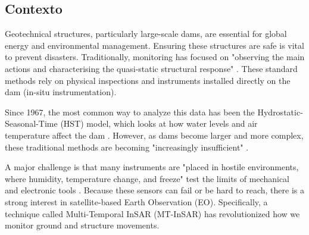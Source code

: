 \documentclass[11pt,a4paper]{article}
\begin{document}
\subsection{Contexto}

Geotechnical structures, particularly large-scale dams, are essential for global energy and environmental management. Ensuring these structures are safe is vital to prevent disasters. Traditionally, monitoring has focused on "observing the main actions and characterising the quasi-static structural response" \parencite{mataAnalysisInterpretationObserved2023}. These standard methods rely on physical inspections and instruments installed directly on the dam (in-situ instrumentation).

Since 1967, the most common way to analyze this data has been the Hydrostatic-Seasonal-Time (HST) model, which looks at how water levels and air temperature affect the dam \parencite{salazar2017}. However, as dams become larger and more complex, these traditional methods are becoming "increasingly insufficient" \parencite{hariri-ardebili2023}.

A major challenge is that many instruments are "placed in hostile environments, where humidity, temperature change, and freeze" test the limits of mechanical and electronic tools \parencite{desortis2007}. Because these sensors can fail or be hard to reach, there is a strong interest in satellite-based Earth Observation (EO). Specifically, a technique called Multi-Temporal InSAR (MT-InSAR) has revolutionized how we monitor ground and structure movements.
\end{document}
